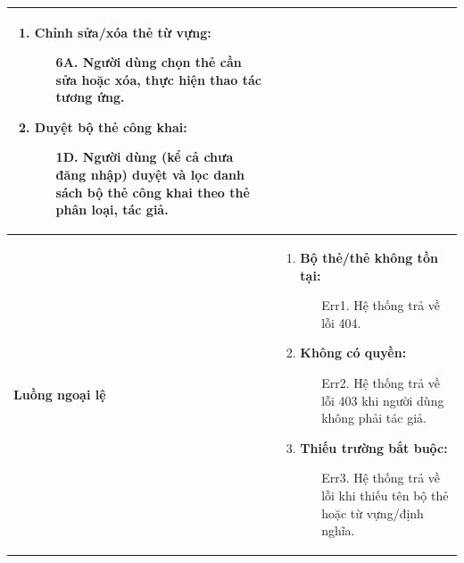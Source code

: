 {\begin{tabularx}{\textwidth}{|>{\raggedright\arraybackslash}X|>{\raggedright\arraybackslash}X|}
\begin{enumerate}
\begin{enumerate}
    \end{enumerate}
    \item \textbf{Chỉnh sửa/xóa thẻ từ vựng:}
    \begin{enumerate}
        \item[6A.] Người dùng chọn thẻ cần sửa hoặc xóa, thực hiện thao tác tương ứng.
    \end{enumerate}
    \item \textbf{Duyệt bộ thẻ công khai:}
    \begin{enumerate}
        \item[1D.] Người dùng (kể cả chưa đăng nhập) duyệt và lọc danh sách bộ thẻ công khai theo thẻ phân loại, tác giả.
    \end{enumerate}
\end{enumerate} \\
\hline
\textbf{Luồng ngoại lệ} &
\begin{enumerate}
    \item \textbf{Bộ thẻ/thẻ không tồn tại:}
    \begin{enumerate}
        \item[Err1.] Hệ thống trả về lỗi 404.
    \end{enumerate}
    \item \textbf{Không có quyền:}
    \begin{enumerate}
        \item[Err2.] Hệ thống trả về lỗi 403 khi người dùng không phải tác giả.
    \end{enumerate}
    \item \textbf{Thiếu trường bắt buộc:}
    \begin{enumerate}
        \item[Err3.] Hệ thống trả về lỗi khi thiếu tên bộ thẻ hoặc từ vựng/định nghĩa.
    \end{enumerate}
\end{enumerate} \\
\hline
\end{tabularx}
}
